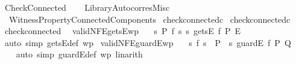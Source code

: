 %
\begin{isabellebody}%
\def\isabellecontext{Check{\isacharunderscore}Connected}%
%
\isadelimtheory
\isanewline
%
\endisadelimtheory
%
\isatagtheory
{}\isamarkupfalse%
\ Check{\isacharunderscore}Connected\isanewline
{}\ \isanewline
\ \ {\isachardoublequoteopen}{\isachardot}{\isachardot}{\isacharslash}Library{\isacharslash}Autocorres{\isacharunderscore}Misc{\isachardoublequoteclose}\isanewline
\ \ {\isachardoublequoteopen}{\isachardot}{\isachardot}{\isacharslash}Witness{\isacharunderscore}Property{\isacharslash}Connected{\isacharunderscore}Components{\isachardoublequoteclose}\isanewline
{}%
\endisatagtheory
{\isafoldtheory}%
%
\isadelimtheory
\isanewline
%
\endisadelimtheory
\isanewline
{}\isamarkupfalse%
\ {\isachardoublequoteopen}check{\isacharunderscore}connected{\isachardot}c{\isachardoublequoteclose}\isanewline
\isanewline
{}\isamarkupfalse%
\ {\isachardoublequoteopen}check{\isacharunderscore}connected{\isachardot}c{\isachardoublequoteclose}\isanewline
\isanewline
{}\isamarkupfalse%
\ check{\isacharunderscore}connected\ \isanewline
\isanewline
\isanewline
\isanewline
{}\isamarkupfalse%
\ validNFE{\isacharunderscore}getsE{\isacharbrackleft}wp{\isacharbrackright}{\isacharcolon}\ \isanewline
\ \ {\isachardoublequoteopen}{\isasymlbrace}{\isasymlambda}s{\isachardot}\ P\ {\isacharparenleft}f\ s{\isacharparenright}\ s{\isasymrbrace}\ getsE\ f\ {\isasymlbrace}P{\isasymrbrace}{\isacharcomma}\ {\isasymlbrace}E{\isasymrbrace}{\isacharbang}{\isachardoublequoteclose}\isanewline
%
\isadelimproof
\ \ %
\endisadelimproof
%
\isatagproof
{}\isamarkupfalse%
\ {\isacharparenleft}auto\ simp{\isacharcolon}\ getsE{\isacharunderscore}def{\isacharparenright}\ wp%
\endisatagproof
{\isafoldproof}%
%
\isadelimproof
\isanewline
%
\endisadelimproof
\isanewline
{}\isamarkupfalse%
\ validNFE{\isacharunderscore}guardE{\isacharbrackleft}wp{\isacharbrackright}{\isacharcolon}\ \isanewline
\ \ {\isachardoublequoteopen}{\isasymlbrace}{\isasymlambda}s{\isachardot}\ f\ s\ {\isasymand}\ P\ {\isacharparenleft}{\isacharparenright}\ s{\isasymrbrace}\ guardE\ f\ {\isasymlbrace}P{\isasymrbrace}{\isacharcomma}\ {\isasymlbrace}Q{\isasymrbrace}{\isacharbang}{\isachardoublequoteclose}\ \isanewline
%
\isadelimproof
\ \ %
\endisadelimproof
%
\isatagproof
{}\isamarkupfalse%
\ {\isacharparenleft}auto\ simp{\isacharcolon}\ guardE{\isacharunderscore}def{\isacharcomma}\ wp{\isacharcomma}\ linarith{\isacharparenright}%

\end{isabellebody}
